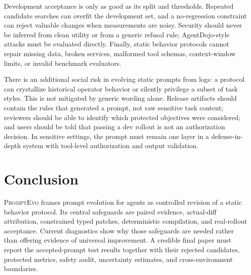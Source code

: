 \documentclass[10pt]{article}
\newcommand{\method}{\textsc{PromptEvo}}
\begin{document}
Development acceptance is only as good as its split and thresholds. Repeated candidate searches can overfit the development set, and a no-regression constraint can reject valuable changes when measurements are noisy. Security should never be inferred from clean utility or from a generic refusal rule; AgentDojo-style attacks must be evaluated directly. Finally, static behavior protocols cannot repair missing data, broken services, malformed tool schemas, context-window limits, or invalid benchmark evaluators.

There is an additional social risk in evolving static prompts from logs: a protocol can crystallize historical operator behavior or silently privilege a subset of task styles. This is not mitigated by generic wording alone. Release artifacts should contain the rules that generated a prompt, not raw sensitive task content; reviewers should be able to identify which protected objectives were considered; and users should be told that passing a dev rollout is not an authorization decision. In sensitive settings, the prompt must remain one layer in a defense-in-depth system with tool-level authorization and output validation.

\section{Conclusion}
\method{} frames prompt evolution for agents as controlled revision of a static behavior protocol. Its central safeguards are paired evidence, actual-diff attribution, constrained typed patches, deterministic compilation, and real-rollout acceptance. Current diagnostics show why those safeguards are needed rather than offering evidence of universal improvement. A credible final paper must report the accepted-prompt test results together with their rejected candidates, protected metrics, safety audit, uncertainty estimates, and cross-environment boundaries.

\appendix
\end{document}
